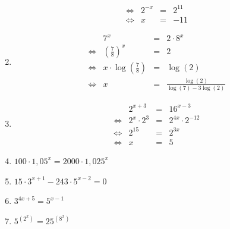 \begin{oef}
\begin{opl}
\begin{enumerate}
\[\begin{array}{rrclcl}
            \iff & 2^{-x} & = & 2^{11} \\
            \iff & x & = & -11
          \end{array}
        \]
  \item \[
          \begin{array}{rrclcl}
                 & 7^x & = & 2 \cdot 8^x \\[2mm]
            \iff & \displaystyle\left(\frac78\right)^x & = & 2 \\[2mm]
            \iff & \displaystyle x \cdot \log(\frac78) & = & \log(2) \\[2mm]
            \iff & x & = & \displaystyle \frac{\log(2)}{\log(7) - 3 \log(2)}
          \end{array}
        \]
  \item \[
          \begin{array}{rrclcl}
                 & 2^{x+3} & = & 16^{x-3} \\
            \iff & 2^x \cdot 2^3 & = & 2^{4x} \cdot 2^{-12} \\
            \iff & 2^{15} & = & 2^{3x} \\
            \iff & x & = & 5
          \end{array}
        \]
  \item $100 \cdot 1,05^x=2000\cdot 1,025^x$
  \item $15\cdot 3^{x+1}-243\cdot 5^{x-2}=0$
  \item $3^{4x+5}=5^{x-1}$
  \item $5^{(2^x)} = 25^{(8^x)}$
\end{enumerate}
\end{opl}
\end{oef}

